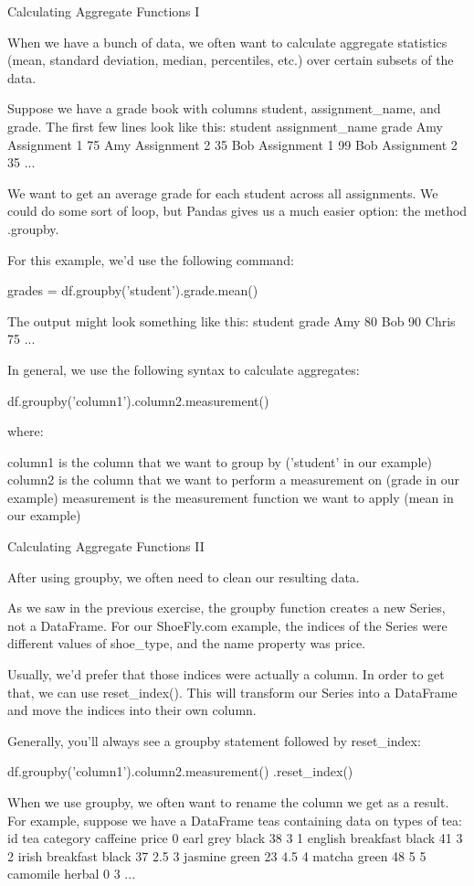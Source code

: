 \documentclass{journal}
\begin{document}
Calculating Aggregate Functions I

When we have a bunch of data, we often want to calculate aggregate statistics (mean, standard deviation, median, percentiles, etc.) over certain subsets of the data.

Suppose we have a grade book with columns student, assignment_name, and grade. The first few lines look like this:
student 	assignment_name 	grade
Amy 	Assignment 1 	75
Amy 	Assignment 2 	35
Bob 	Assignment 1 	99
Bob 	Assignment 2 	35
... 		
	

We want to get an average grade for each student across all assignments. We could do some sort of loop, but Pandas gives us a much easier option: the method .groupby.

For this example, we'd use the following command:

grades = df.groupby('student').grade.mean()

The output might look something like this:
student 	grade
Amy 	80
Bob 	90
Chris 	75
... 	
	

In general, we use the following syntax to calculate aggregates:

df.groupby('column1').column2.measurement()

where:

    column1 is the column that we want to group by ('student' in our example)
    column2 is the column that we want to perform a measurement on (grade in our example)
    measurement is the measurement function we want to apply (mean in our example)


Calculating Aggregate Functions II

After using groupby, we often need to clean our resulting data.

As we saw in the previous exercise, the groupby function creates a new Series, not a DataFrame. For our ShoeFly.com example, the indices of the Series were different values of shoe_type, and the name property was price.

Usually, we'd prefer that those indices were actually a column. In order to get that, we can use reset_index(). This will transform our Series into a DataFrame and move the indices into their own column.

Generally, you'll always see a groupby statement followed by reset_index:

df.groupby('column1').column2.measurement()
    .reset_index()

When we use groupby, we often want to rename the column we get as a result. For example, suppose we have a DataFrame teas containing data on types of tea:
id 	tea 	category 	caffeine 	price
0 	earl grey 	black 	38 	3
1 	english breakfast 	black 	41 	3
2 	irish breakfast 	black 	37 	2.5
3 	jasmine 	green 	23 	4.5
4 	matcha 	green 	48 	5
5 	camomile 	herbal 	0 	3
... 				
\end{document}
